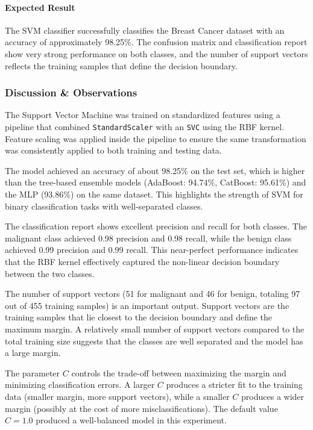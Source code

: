 \documentclass[a4paper,11pt]{article}
\begin{document}
\begin{itemize}
\paragraph{Expected Result}
The SVM classifier successfully classifies the Breast Cancer dataset with an accuracy of approximately 98.25\%. The confusion matrix and classification report show very strong performance on both classes, and the number of support vectors reflects the training samples that define the decision boundary.

\subsubsection{Discussion \& Observations}

The Support Vector Machine was trained on standardized features using a pipeline that combined \texttt{StandardScaler} with an \texttt{SVC} using the RBF kernel. Feature scaling was applied inside the pipeline to ensure the same transformation was consistently applied to both training and testing data.

The model achieved an accuracy of about 98.25\% on the test set, which is higher than the tree-based ensemble models (AdaBoost: 94.74\%, CatBoost: 95.61\%) and the MLP (93.86\%) on the same dataset. This highlights the strength of SVM for binary classification tasks with well-separated classes.

The classification report shows excellent precision and recall for both classes. The malignant class achieved 0.98 precision and 0.98 recall, while the benign class achieved 0.99 precision and 0.99 recall. This near-perfect performance indicates that the RBF kernel effectively captured the non-linear decision boundary between the two classes.

The number of support vectors (51 for malignant and 46 for benign, totaling 97 out of 455 training samples) is an important output. Support vectors are the training samples that lie closest to the decision boundary and define the maximum margin. A relatively small number of support vectors compared to the total training size suggests that the classes are well separated and the model has a large margin.

The parameter $C$ controls the trade-off between maximizing the margin and minimizing classification errors. A larger $C$ produces a stricter fit to the training data (smaller margin, more support vectors), while a smaller $C$ produces a wider margin (possibly at the cost of more misclassifications). The default value $C = 1.0$ produced a well-balanced model in this experiment.


\end{itemize}
\end{document}
